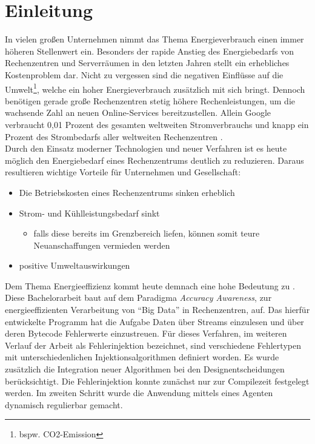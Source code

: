 \chapter{Einleitung} \vspace{1cm}
In vielen gro\ss en Unternehmen nimmt das Thema Energieverbrauch einen immer h\"oheren Stellenwert ein. Besonders der rapide Anstieg des Energiebedarfs von Rechenzentren und Serverr\"aumen in den letzten Jahren stellt ein erhebliches Kostenproblem dar. Nicht zu vergessen sind die negativen Einfl\"usse auf die Umwelt\footnote{bspw. CO2-Emission}, welche ein hoher Energieverbrauch zus\"atzlich mit sich bringt. Dennoch ben\"otigen gerade gro\ss e Rechenzentren stetig h\"ohere Rechenleistungen, um die wachsende Zahl an neuen Online-Services bereitzustellen. Allein Google verbraucht 0,01 Prozent des gesamten weltweiten Stromverbrauchs und knapp ein Prozent des Strombedarfs aller weltweiten Rechenzentren \cite{Kommey}. \\
Durch den Einsatz moderner Technologien und neuer Verfahren ist es heute m\"oglich den Energiebedarf eines Rechenzentrums deutlich zu reduzieren. Daraus resultieren wichtige Vorteile f\"ur Unternehmen und Gesellschaft:
\begin{itemize}\itemsep0pt
	\item Die Betriebskosten eines Rechenzentrums sinken erheblich
	\item Strom- und K\"uhlleistungsbedarf sinkt
	\begin{itemize}
		\item falls diese bereits im Grenzbereich liefen, k\"onnen somit teure Neuanschaffungen vermieden werden
	\end{itemize}	 
	\item positive Umweltauswirkungen  
\end{itemize}
Dem Thema Energieeffizienz kommt heute demnach eine hohe Bedeutung zu \cite{BITKOM}.\\
Diese Bachelorarbeit baut auf dem Paradigma \textit{Accuracy Awareness}, zur energieeffizienten Verarbeitung von ``Big Data'' in Rechenzentren, auf. Das hierf\"ur entwickelte Programm hat die Aufgabe Daten \"uber Streams einzulesen und \"uber deren Bytecode Fehlerwerte einzustreuen. F\"ur dieses Verfahren, im weiteren Verlauf der Arbeit als Fehlerinjektion bezeichnet,  sind verschiedene Fehlertypen mit unterschiedenlichen Injektionsalgorithmen definiert worden. Es wurde zus\"atzlich die Integration neuer Algorithmen bei den Designentscheidungen ber\"ucksichtigt. Die Fehlerinjektion konnte zun\"achst nur zur Compilezeit festgelegt werden. Im zweiten Schritt wurde die Anwendung mittels eines Agenten dynamisch regulierbar gemacht. \\
